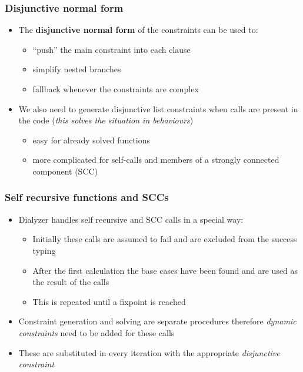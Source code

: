 \documentclass{beamer}
\begin{document}
\begin{frame}
  \frametitle{Disjunctive normal form}
  \begin{itemize}
  \item The \textbf{disjunctive normal form} of the constraints can be
    used to:
    \begin{itemize}
      \item ``push'' the main constraint into each clause
      \item simplify nested branches
      \item fallback whenever the constraints are complex
    \end{itemize} \pause
  \item We also need to generate disjunctive list constraints when
    calls are present in the code (\emph{this solves the situation in
      behaviours})
    \begin{itemize}
    \item easy for already solved functions
    \item more complicated for self-calls and members of a strongly
      connected component (SCC)
    \end{itemize}
  \end{itemize}
\end{frame}

\begin{frame}
  \frametitle{Self recursive functions and SCCs}
  \begin{itemize}
  \item Dialyzer handles self recursive and SCC calls in a special
    way: \pause
    \begin{itemize}
    \item Initially these calls are assumed to fail and are excluded
      from the success typing \pause
    \item After the first calculation the base cases have been found
      and are used as the result of the calls \pause
    \item This is repeated until a fixpoint is reached \pause
    \end{itemize}
  \item Constraint generation and solving are separate procedures
    therefore \emph{dynamic constraints} need to be added for these
    calls \pause
  \item These are substituted in every iteration with the appropriate
    \emph{disjunctive constraint}
  \end{itemize}
\end{frame}
\end{document}
